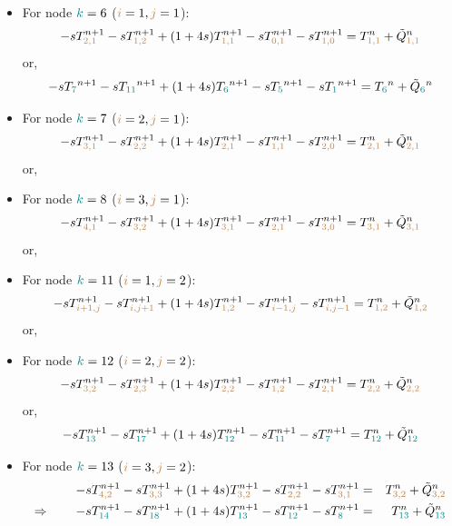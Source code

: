 \begin{itemize}
\item For node ${\color{teal}k}=6$ (${\color{brown}i}=1,{\color{brown}j}=1$):
\[
-s T_{{\color{brown}2,1}}^{n+1}
-s T_{{\color{brown}1,2}}^{n+1} 
+(1+4s)T_{{\color{brown}1,1}}^{n+1} 
-s T_{{\color{brown}0,1}}^{n+1} 
-s T_{{\color{brown}1,0}}^{n+1} 
= T_{{\color{brown}1,1}}^n +\tilde{Q}_{{\color{brown}1,1}}^n
\]
or, 
\[
-s T_{\color{teal} 7}^{n+1}-s T_{\color{teal} 11}^{n+1} +(1+4s)T_{\color{teal} 6}^{n+1} -s T_{\color{teal} 5}^{n+1} -s T_{\color{teal} 1}^{n+1} 
= T_{\color{teal} 6}^n +\tilde{Q}_{\color{teal} 6}^n
\]

\item For node ${\color{teal}k}=7$ (${\color{brown}i}=2,{\color{brown}j}=1$):
\[
-s T_{{\color{brown} 3,1}}^{n+1}
-s T_{{\color{brown}2,2}}^{n+1} 
+(1+4s)T_{{\color{brown}2,1}}^{n+1} 
-s T_{{\color{brown}1,1}}^{n+1} 
-s T_{{\color{brown}2,0}}^{n+1} 
= T_{{\color{brown}2,1}}^n 
+\tilde{Q}_{{\color{brown}2,1}}^n
\]
or,

\item For node ${\color{teal}k}=8$ (${\color{brown}i}=3,{\color{brown}j}=1$):
\[
-s T_{{\color{brown} 4,1}}^{n+1}
-s T_{{\color{brown}3,2}}^{n+1} 
+(1+4s)T_{{\color{brown}3,1}}^{n+1} 
-s T_{{\color{brown}2,1}}^{n+1} 
-s T_{{\color{brown}3,0}}^{n+1} 
= T_{{\color{brown}3,1}}^n 
+\tilde{Q}_{{\color{brown}3,1}}^n
\]
or,
\item For node ${\color{teal}k}=11$ (${\color{brown}i}=1,{\color{brown}j}=2$):
\[
-s T_{{\color{brown} i+1,j}}^{n+1}
-s T_{{\color{brown}i,j+1}}^{n+1} 
+(1+4s)T_{{\color{brown}1,2}}^{n+1} 
-s T_{{\color{brown}i-1,j}}^{n+1} 
-s T_{{\color{brown}i,j-1}}^{n+1} 
= T_{{\color{brown}1,2}}^n 
+\tilde{Q}_{{\color{brown}1,2}}^n
\]
or,
\item For node ${\color{teal}k}=12$ (${\color{brown}i}=2,{\color{brown}j}=2$):
\[
-s T_{{\color{brown} 3,2}}^{n+1}
-s T_{{\color{brown}2,3}}^{n+1} 
+(1+4s)T_{{\color{brown}2,2}}^{n+1} 
-s T_{{\color{brown}1,2}}^{n+1} 
-s T_{{\color{brown}2,1}}^{n+1} 
= T_{{\color{brown}2,2}}^n 
+\tilde{Q}_{{\color{brown}2,2}}^n
\]
or,
\[
-s T_{{\color{teal} 13}}^{n+1}
-s T_{{\color{teal} 17}}^{n+1} 
+(1+4s)T_{{\color{teal}12}}^{n+1} 
-s T_{{\color{teal}11}}^{n+1} 
-s T_{{\color{teal}7}}^{n+1} 
= T_{{\color{teal}12}}^n 
+\tilde{Q}_{{\color{teal}12}}^n
\]


\item For node ${\color{teal}k}=13$ (${\color{brown}i}=3,{\color{brown}j}=2$):
\begin{eqnarray}
-s T_{{\color{brown} 4,2}}^{n+1}
-s T_{{\color{brown}3,3}}^{n+1} 
+(1+4s)T_{{\color{brown}3,2}}^{n+1} 
-s T_{{\color{brown}2,2}}^{n+1} 
-s T_{{\color{brown}3,1}}^{n+1} 
&=& T_{{\color{brown}3,2}}^n 
+\tilde{Q}_{{\color{brown}3,2}}^n \nonumber\\
\Rightarrow \qquad
-s T_{{\color{teal} 14}}^{n+1}
-s T_{{\color{teal} 18}}^{n+1} 
+(1+4s)T_{{\color{teal}13}}^{n+1} 
-s T_{{\color{teal}12}}^{n+1} 
-s T_{{\color{teal}8}}^{n+1} 
&=& T_{{\color{teal}13}}^n 
+\tilde{Q}_{{\color{teal}13}}^n \nonumber
\end{eqnarray}


\end{itemize}



